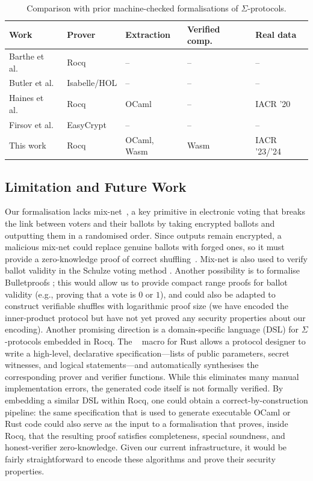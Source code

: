 \documentclass[sigconf,anonymous,review]{acmart}
\begin{document}
\begin{table}
  \caption{Comparison with prior machine-checked formalisations of $\Sigma$-protocols.}
  \label{tab:comparison}
  \footnotesize
  \setlength{\tabcolsep}{3pt}
  \begin{tabular}{@{}lllll@{}}
    \toprule
    Work & Prover & Extraction & Verified comp. & Real data\\
    \midrule
    Barthe et al.~\cite{5552642} & Rocq & -- & -- & --\\
    Butler et al.~\cite{butler2021formalising} & Isabelle/HOL & -- & -- & --\\
    Haines et al.~\cite{287095} & Rocq & OCaml & -- & IACR '20\\
    Firsov et al.~\cite{10221929} & EasyCrypt & -- & -- & --\\
    This work & Rocq & OCaml, Wasm & Wasm & IACR '23/'24\\
    \bottomrule
  \end{tabular}
\end{table}

\subsection{Limitation and Future Work}
Our formalisation lacks mix-net~\cite{10.1145/358549.358563}, a key primitive in electronic voting that breaks the link between voters and their ballots by taking encrypted ballots and outputting them in a randomised order. Since outputs remain encrypted, a malicious mix-net could replace genuine ballots with forged ones, so it must provide a zero-knowledge proof of correct shuffling~\cite{10.1007/978-3-642-02620-1_28,10.1007/978-3-642-29011-4_17}. Mix-net is also used to verify ballot validity in the Schulze voting method \cite{haines2019verifiable}. Another possibility is to formalise Bulletproofs \cite{bunz2018bulletproofs}; this would allow us to provide compact range proofs for ballot validity (e.g., proving that a vote is $0$ or $1$), and could also be adapted to construct verifiable shuffles with logarithmic proof size (we have encoded the inner-product protocol but have not yet proved any security properties about our encoding). Another promising direction is a domain-specific language (DSL) for $\Sigma$-protocols embedded in Rocq. The \texttt{}~\cite{sigma-compiler,cryptoeprint:2026/794} macro for Rust allows a protocol designer to write a high-level, declarative specification---lists of public parameters, secret witnesses, and logical statements---and automatically synthesises the corresponding prover and verifier functions. While this eliminates many manual implementation errors, the generated code itself is not formally verified. By embedding a similar DSL within Rocq, one could obtain a correct-by-construction pipeline: the same specification that is used to generate executable OCaml or Rust code could also serve as the input to a formalisation that proves, inside Rocq, that the resulting proof satisfies completeness, special soundness, and honest-verifier zero-knowledge. Given our current infrastructure, it would be fairly straightforward to  encode these algorithms and prove their security properties. 
   
\end{document}

